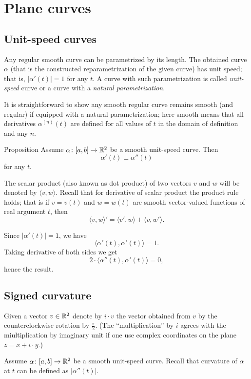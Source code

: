 \chapter{Plane curves}


\section{Unit-speed curves}

Any regular smooth curve can be parametrized by its length.
The obtained curve $\alpha$ (that is the constructed reparametrization of the given curve) has unit speed; 
that is, $|\alpha'(t)|=1$ for any $t$.
A curve with such parametrization is called \emph{unit-speed} curve
or a curve with a \emph{natural parametrization}. 

It is straightforward to show any smooth regular curve remains smooth (and regular) if equipped with a natural parametrization; 
here smooth means that all derivatives $\alpha^{(n)}(t)$ are defined for all values of $t$ in the domain of definition and any $n$.

\begin{thm}{Proposition}\label{prop:a'-pertp-a''}
Assume $\alpha\colon[a,b]\to\mathbb{R}^2$ be a smooth unit-speed curve.
Then 
\[\alpha'(t)\perp \alpha''(t)\]
for any $t$.
\end{thm}

The scalar product (also known as dot product) of two vectors $v$ and $w$ will be denoted by $\langle v,w\rangle$.
Recall that for derivative of scalar product the product rule holds;
that is if $v=v(t)$ and $w=w(t)$ are smooth vector-valued functions of real argument $t$, then
\[\langle v,w\rangle'=\langle v',w\rangle+\langle v,w'\rangle.\]

Since $|\alpha'(t)|=1$, we have
\[\langle\alpha'(t),\alpha'(t)\rangle=1.\]
Taking derivative of both sides we get
\[2\cdot\langle\alpha''(t),\alpha'(t)\rangle=0,\]
hence the result.
\qeds

\section{Signed curvature}

Given a vector $v\in \mathbb{R}^2$ denote by $i\cdot v$ the vector obtained from $v$ by the counterclockwise rotation by $\tfrac\pi2$.
(The ``multiplication'' by $i$ agrees with the miultiplication by imaginary unit if one use  complex coordinates on the plane $z=x+i\cdot y$.)

Assume $\alpha\colon[a,b]\to\mathbb{R}^2$ be a smooth unit-speed curve.
Recall that curvature of $\alpha$ at $t$ can be defined as $|\alpha''(t)|$.

